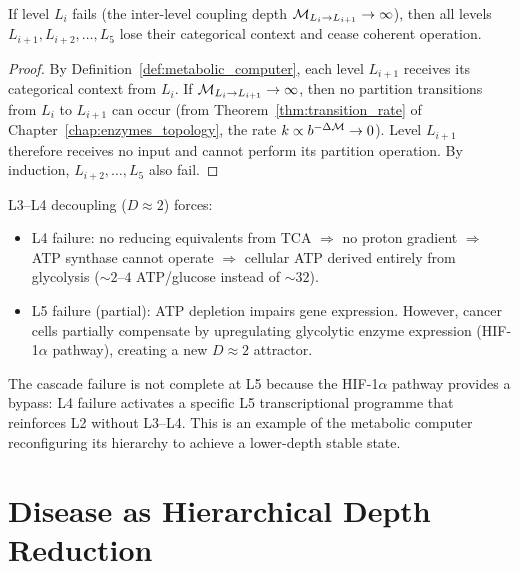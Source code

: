 \begin{theorem}
\label{thm:cascade_failure}
If level $L_i$ fails (the inter-level coupling depth
$\mathcal{M}_{L_i \to L_{i+1}} \to \infty$), then all levels
$L_{i+1}, L_{i+2}, \ldots, L_5$ lose their categorical context and
cease coherent operation.
\end{theorem}

\begin{proof}
By Definition~\ref{def:metabolic_computer}, each level $L_{i+1}$ receives
its categorical context from $L_i$. If $\mathcal{M}_{L_i \to L_{i+1}} \to \infty$,
then no partition transitions from $L_i$ to $L_{i+1}$ can occur
(from Theorem~\ref{thm:transition_rate} of Chapter~\ref{chap:enzymes_topology},
the rate $k \propto b^{-\Delta\mathcal{M}} \to 0$).
Level $L_{i+1}$ therefore receives no input and cannot perform its
partition operation. By induction, $L_{i+2}, \ldots, L_5$ also fail.
\end{proof}

\begin{example}
L3--L4 decoupling ($D \approx 2$) forces:
\begin{itemize}
  \item L4 failure: no reducing equivalents from TCA $\Rightarrow$ no
        proton gradient $\Rightarrow$ ATP synthase cannot operate
        $\Rightarrow$ cellular ATP derived entirely from glycolysis
        ($\sim 2$--$4$ ATP/glucose instead of $\sim 32$).
  \item L5 failure (partial): ATP depletion impairs gene expression.
        However, cancer cells partially compensate by upregulating
        glycolytic enzyme expression (HIF-1$\alpha$ pathway), creating
        a new $D \approx 2$ attractor.
\end{itemize}
The cascade failure is not complete at L5 because the HIF-1$\alpha$
pathway provides a bypass: L4 failure activates a specific L5 transcriptional
programme that reinforces L2 without L3--L4. This is an example of the
metabolic computer reconfiguring its hierarchy to achieve a lower-depth
stable state.
\end{example}

\section{Disease as Hierarchical Depth Reduction}
\label{sec:disease_depth}

